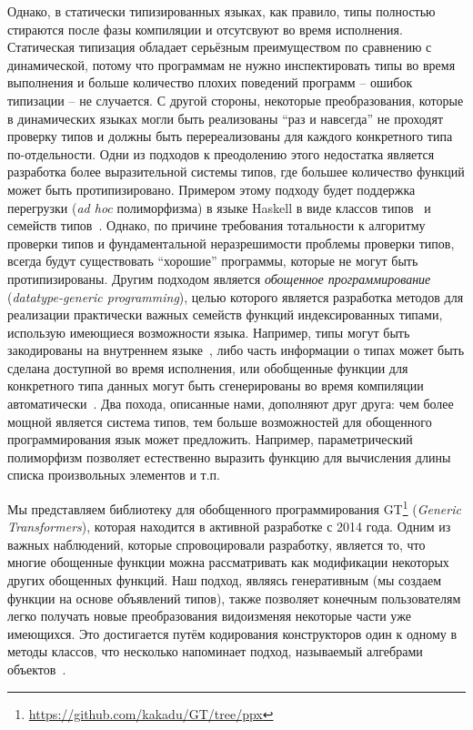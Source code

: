 Однако, в статически типизированных языках, как правило, типы полностью стираются 
после фазы компиляции и отсутсвуют во время исполнения. Статическая типизация обладает серьёзным преимуществом по сравнению с динамической, потому что программам
не нужно инспектировать типы во время выполнения и больше количество плохих поведений программ -- ошибок типизации -- не случается. С другой стороны, некоторые преобразования, которые в динамических языках могли быть реализованы ``раз и навсегда'' не проходят проверку типов и должны быть перереализованы для каждого конкретного типа по-отдельности. Одни из подходов к преодолению этого недостатка является разработка более выразительной системы типов, где большее количество функций может быть протипизировано. Примером этому подходу будет поддержка перегрузки (\emph{ad hoc} полиморфизма) в языке Haskell в виде классов 
типов~\cite{TypeClasses} и семейств типов~\cite{TypeFamilies}. Однако, по причине требования тотальности к алгоритму проверки типов и фундаментальной неразрешимости проблемы проверки типов, всегда будут существовать ``хорошие'' программы, которые
не могут быть протипизированы. Другим подходом является \emph{обощенное программирование}~\cite{DGP} (\emph{datatype-generic programming}), целью которого является разработка методов для реализации практически важных семейств функций
индексированных типами, использую имеющиеся возможности языка. Например, типы могут быть закодированы на внутреннем языке~\cite{Hinze,InstantGenerics,GenericOCaml}, либо часть информации о типах может быть сделана доступной во время исполнения, или 
обобщенные функции для конкретного типа данных могут быть сгенерированы во время
компиляции автоматически~\cite{Yallop,PPXLib}. Два похода, описанные нами, дополняют друг друга: чем более мощной является система типов, тем больше возможностей для обощенного программирования язык может предложить. Например, параметрический полиморфизм позволяет естественно выразить функцию для вычисления длины списка произвольных элементов и т.п.

Мы представляем библиотеку для обобщенного программирования \textsc{GT}\footnote{\url{https://github.com/kakadu/GT/tree/ppx}} (\emph{Generic Transformers}), которая находится в активной разработке с 2014 года. Одним из важных наблюдений, которые спровоцировали разработку, является то, что многие обощенные функции можна рассматривать как модификации некоторых других обощенных функций. Наш подход, являясь генеративным (мы создаем функции на основе объявлений типов), также позволяет конечным пользователям легко получать новые преобразования видоизменяя некоторые части уже имеющихся. Это достигается путём кодирования конструкторов один к одному в методы классов, что несколько напоминает подход, называемый алгебрами объектов~\cite{ObjectAlgebras}.

